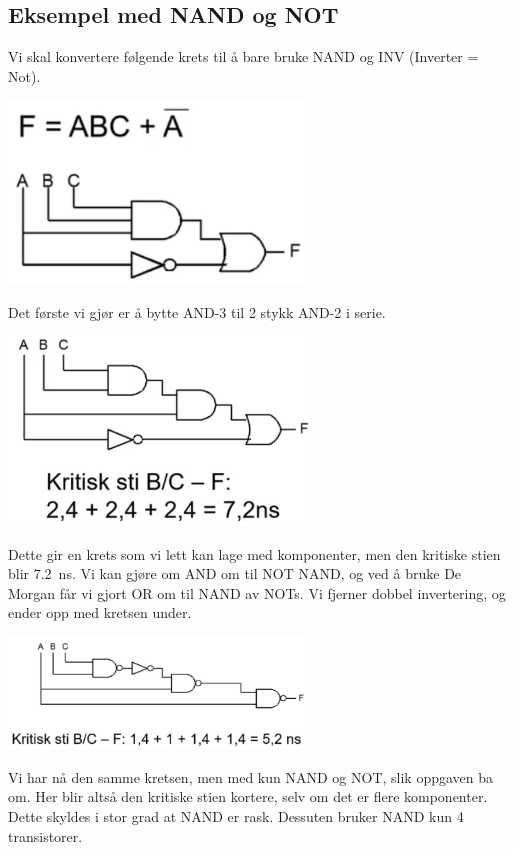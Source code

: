 \documentclass[12pt,a4paper,norsk]{article}
\begin{document}
\subsection{Eksempel med NAND og NOT}
Vi skal konvertere følgende krets til å bare bruke NAND og INV (Inverter = Not).
\begin{center}
  \includegraphics[width=0.6\textwidth,height=\textheight,keepaspectratio]{Krets_BeforeTeknomap}
\end{center}
Det første vi gjør er å bytte AND-3 til 2 stykk AND-2 i serie.
\begin{center}
  \includegraphics[width=0.6\textwidth,height=\textheight,keepaspectratio]{Krets_DuringTeknomap}
\end{center}
Dette gir en krets som vi lett kan lage med komponenter, men den kritiske stien blir
\SI{7.2}{\nano\second}. Vi kan gjøre om AND om til NOT NAND, og ved å bruke De
Morgan får vi gjort OR om til NAND av NOTs. Vi fjerner dobbel invertering, og
ender opp med kretsen under.
\begin{center}
  \includegraphics[width=0.6\textwidth,height=\textheight,keepaspectratio]{Krets_AfterTeknomap}
\end{center}
Vi har nå den samme kretsen, men med kun NAND og NOT, slik oppgaven ba om. Her
blir altså den kritiske stien kortere, selv om det er flere komponenter. Dette
skyldes i stor grad at NAND er rask. Dessuten bruker NAND kun 4 transistorer.
\end{document}
